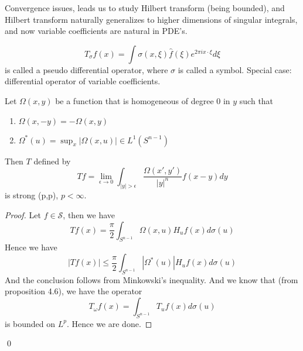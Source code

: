\begin{note}
    Convergence issues, leads us to study Hilbert transform (being bounded), and Hilbert transform naturally generalizes to higher dimensions of singular integrals, and now variable coefficients are natural in PDE's.
\end{note}
\begin{definition}
    \begin{equation*}
        T_\sigma f(x)=\int\sigma(x,\xi)\hat{f}(\xi)e^{2\pi ix\cdot\xi}d\xi
    \end{equation*}
    is called a pseudo differential operator, where $\sigma$ is called a symbol. Special case: differential operator of variable coefficients.
\end{definition}
\begin{theorem}
    Let $\Omega(x,y)$ be a function that is homogeneous of degree 0 in $y$ such that
    \begin{enumerate}
        \item $\Omega(x,-y)=-\Omega(x,y)$
        \item $\Omega^*(u)=\sup_x|\Omega(x,u)|\in L^1(S^{n-1})$
    \end{enumerate}
    Then $T$ defined by 
    \begin{equation*}
         Tf=\lim_{\epsilon\to 0}\int_{|y|>\epsilon}\frac{\Omega(x', y')}{|y|^n}f(x-y)dy
    \end{equation*}
    is strong (p,p), $p<\infty$.
\end{theorem}
\begin{proof}
    Let $f\in\mathcal{S}$, then we have
    \begin{equation*}
        Tf(x)=\frac{\pi}{2}\int_{S^{n-1}}\Omega(x,u)H_uf(x)d\sigma(u)
    \end{equation*}
    Hence we have
    \begin{equation*}
        |Tf(x)|\leq\frac{\pi}{2}\int_{S^{n-1}}|\Omega^*(u)|H_uf(x)d\sigma(u)
    \end{equation*}
    And the conclusion follows from Minkowski's inequality.
    And we know that (from proposition 4.6), we have the operator
    \begin{equation*}
        T_\omega f(x)=\int_{S^{n-1}}T_uf(x)d\sigma(u)
    \end{equation*}
    is bounded on $L^p$. Hence we are done.
\end{proof}
\qed

